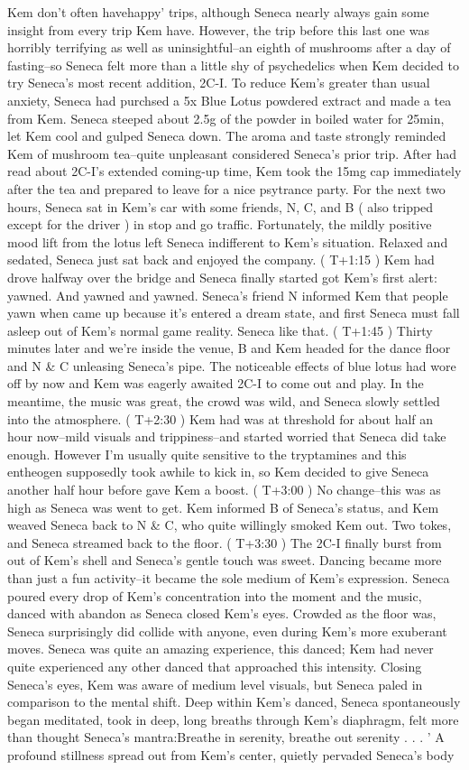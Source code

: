 \documentclass[12pt]{book}
\begin{document}
Kem don't often havehappy' trips, although Seneca nearly always gain some insight from every trip Kem have. However, the trip before this last one was horribly terrifying as well as uninsightful--an eighth of mushrooms after a day of fasting--so Seneca felt more than a little shy of psychedelics when Kem decided to try Seneca's most recent addition, 2C-I. To reduce Kem's greater than usual anxiety, Seneca had purchsed a 5x Blue Lotus powdered extract and made a tea from Kem. Seneca steeped about 2.5g of the powder in boiled water for 25min, let Kem cool and gulped Seneca down. The aroma and taste strongly reminded Kem of mushroom tea--quite unpleasant considered Seneca's prior trip. After had read about 2C-I's extended coming-up time, Kem took the 15mg cap immediately after the tea and prepared to leave for a nice psytrance party. For the next two hours, Seneca sat in Kem's car with some friends, N, C, and B ( also tripped except for the driver ) in stop and go traffic. Fortunately, the mildly positive mood lift from the lotus left Seneca indifferent to Kem's situation. Relaxed and sedated, Seneca just sat back and enjoyed the company. ( T+1:15 ) Kem had drove halfway over the bridge and Seneca finally started got Kem's first alert: yawned. And yawned and yawned. Seneca's friend N informed Kem that people yawn when came up because it's entered a dream state, and first Seneca must fall asleep out of Kem's normal game reality. Seneca like that. ( T+1:45 ) Thirty minutes later and we're inside the venue, B and Kem headed for the dance floor and N \& C unleasing Seneca's pipe. The noticeable effects of blue lotus had wore off by now and Kem was eagerly awaited 2C-I to come out and play. In the meantime, the music was great, the crowd was wild, and Seneca slowly settled into the atmosphere. ( T+2:30 ) Kem had was at threshold for about half an hour now--mild visuals and trippiness--and started worried that Seneca did take enough. However I'm usually quite sensitive to the tryptamines and this entheogen supposedly took awhile to kick in, so Kem decided to give Seneca another half hour before gave Kem a boost. ( T+3:00 ) No change--this was as high as Seneca was went to get. Kem informed B of Seneca's status, and Kem weaved Seneca back to N \& C, who quite willingly smoked Kem out. Two tokes, and Seneca streamed back to the floor. ( T+3:30 ) The 2C-I finally burst from out of Kem's shell and Seneca's gentle touch was sweet. Dancing became more than just a fun activity--it became the sole medium of Kem's expression. Seneca poured every drop of Kem's concentration into the moment and the music, danced with abandon as Seneca closed Kem's eyes. Crowded as the floor was, Seneca surprisingly did collide with anyone, even during Kem's more exuberant moves. Seneca was quite an amazing experience, this danced; Kem had never quite experienced any other danced that approached this intensity. Closing Seneca's eyes, Kem was aware of medium level visuals, but Seneca paled in comparison to the mental shift. Deep within Kem's danced, Seneca spontaneously began meditated, took in deep, long breaths through Kem's diaphragm, felt more than thought Seneca's mantra:Breathe in serenity, breathe out serenity . . .  ' A profound stillness spread out from Kem's center, quietly pervaded Seneca's body 
\end{document}

